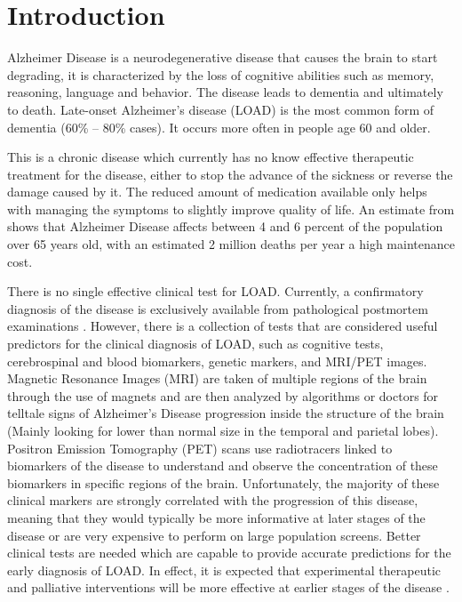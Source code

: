 \chapter{Introduction} \label{introduction}

Alzheimer Disease is a neurodegenerative disease that causes the brain to start degrading, it is characterized by the loss of cognitive abilities such as memory, reasoning, language and behavior. The disease leads to dementia and ultimately to death. Late-onset Alzheimer's disease (LOAD) is the most common form of dementia (60\% -- 80\% cases). It occurs more often in people age 60 and older. 

This is a chronic disease which currently has no know effective therapeutic treatment for the disease, either to stop the advance of the sickness or reverse the damage caused by it. The reduced amount of medication available only helps with managing the symptoms to slightly improve quality of life. An estimate from \cite{Ballard2011}  shows that Alzheimer Disease affects between 4 and 6 percent of the population over 65 years old, with an estimated 2 million deaths per year a high maintenance cost.

There is no single effective clinical test for LOAD. Currently, a confirmatory diagnosis of the disease is exclusively available from pathological postmortem examinations \cite{SHAO20171}. However, there is a collection of tests that are considered useful predictors for the clinical diagnosis of LOAD, such as cognitive tests, cerebrospinal and blood biomarkers, genetic markers, and MRI/PET images\cite{Li2017}. Magnetic Resonance Images (MRI) are taken of multiple regions of the brain through the use of magnets and are then analyzed by algorithms or doctors for telltale signs of Alzheimer's Disease progression inside the structure of the brain (Mainly looking for lower than normal size in the temporal and parietal lobes). Positron Emission Tomography (PET) scans use radiotracers linked to biomarkers of the disease to understand and observe the concentration of these biomarkers in specific regions of the brain.
\newpage
Unfortunately, the majority of these clinical markers are strongly correlated with the progression of this disease, meaning that they would typically be more informative at later stages of the disease or are very expensive to perform on large population screens. Better clinical tests are needed which are capable to provide accurate predictions for the early diagnosis of LOAD. In effect, it is expected that experimental therapeutic and palliative interventions will be more effective at earlier stages of the disease \cite{biogen2016}.

